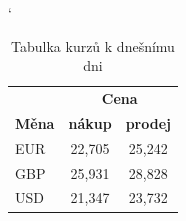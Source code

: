 \documentclass[a4paper, 11pt]{article}
\begin{document}
\begin{table}[ht]
    \catcode` %
    \centering
    \begin{tabular}{|l|c|c|} 
        \hline
        & \multicolumn{2}{c|}{\textbf{Cena}} \\ \cline{2-3}
        \textbf{Měna} & \textbf{nákup} & \textbf{prodej} \\ 
        \hline
        EUR & 22,705 & 25,242 \\
        GBP & 25,931 & 28,828 \\
        USD & 21,347 & 23,732 \\ 
        \hline
    \end{tabular}
    \caption{Tabulka kurzů k dnešnímu dni}
    \label{tab:currency}
\end{table}

\bigskip
\end{document}
